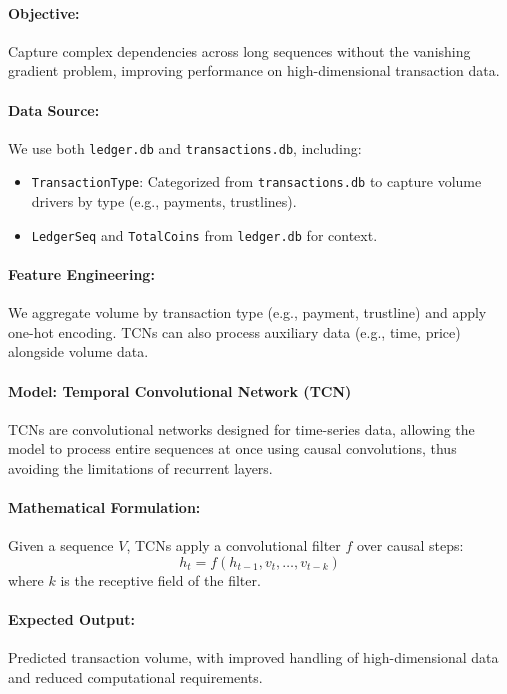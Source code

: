 \documentclass{article}
\begin{document}
\paragraph{Objective:} Capture complex dependencies across long sequences without the vanishing gradient problem, improving performance on high-dimensional transaction data.

\paragraph{Data Source:}
We use both \texttt{ledger.db} and \texttt{transactions.db}, including:
\begin{itemize}
    \item \texttt{TransactionType}: Categorized from \texttt{transactions.db} to capture volume drivers by type (e.g., payments, trustlines).
    \item \texttt{LedgerSeq} and \texttt{TotalCoins} from \texttt{ledger.db} for context.
\end{itemize}

\paragraph{Feature Engineering:}
We aggregate volume by transaction type (e.g., payment, trustline) and apply one-hot encoding. TCNs can also process auxiliary data (e.g., time, price) alongside volume data.

\paragraph{Model: Temporal Convolutional Network (TCN)}
TCNs are convolutional networks designed for time-series data, allowing the model to process entire sequences at once using causal convolutions, thus avoiding the limitations of recurrent layers.

\paragraph{Mathematical Formulation:}
Given a sequence $V$, TCNs apply a convolutional filter $f$ over causal steps:
\[
h_t = f(h_{t-1}, v_t, \dots, v_{t-k})
\]
where $k$ is the receptive field of the filter.

\paragraph{Expected Output:} 
Predicted transaction volume, with improved handling of high-dimensional data and reduced computational requirements.
\end{document}

